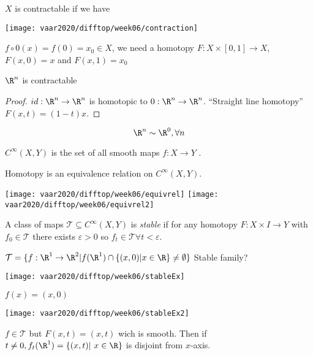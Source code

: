 $X$ is contractable if we have
\begin{center}
    \texttt{[image: vaar2020/difftop/week06/contraction]}
\end{center}
$f \circ 0(x)= f(0)=x_0 \in X$, we need a homotopy
\newline $F: X\times[0,1] \to X$, $F(x,0)=x$ and $F(x,1)=x_0$

\begin{proposition}
  $\R^n$ is contractable
\end{proposition}
\begin{proof}
  $id: \R^n \to \R^n$ is homotopic to $0: \R^n \to \R^n$. ``Straight line homotopy'' $F(x,t)=(1-t)x$.
    \qedhere
\end{proof}
$$\R^n \sim \R^0 , \forall n$$

\begin{notation}
  $C^{\infty}(X,Y)$ is the set of all smooth maps $f: X \to Y$ .
\end{notation}
\begin{remark}
  Homotopy is an equivalence relation on $C^{\infty}(X,Y)$.
\end{remark}

  \begin{center}
    \texttt{[image: vaar2020/difftop/week06/equivrel]}
    \texttt{[image: vaar2020/difftop/week06/equivrel2]}
  \end{center}

\begin{definition}
  A class of maps $\mathcal{T} \subseteq C^{\infty}(X,Y)$ is \emph{stable} if for any homotopy $F: X \times I \to Y$ with $f_0 \in \mathcal{T}$ there exists $\varepsilon >0$ so $f_t \in \mathcal{T} \forall t <\varepsilon$.
\end{definition}
\begin{example}
  $\mathcal{T}=\{f: \R^1 \to \R^2 | f(\R^1) \cap \{(x,0) | x\in \R \} \neq \emptyset \}$ Stable family?
    \begin{center}
      \texttt{[image: vaar2020/difftop/week06/stableEx]}
    \end{center}
\end{example}

\begin{example}
  $f(x)=(x,0)$
  \begin{center}
    \texttt{[image: vaar2020/difftop/week06/stableEx2]}
  \end{center}
  $f \in \mathcal{T}$ but $F(x,t)=(x,t)$ wich is smooth. Then if $t\neq 0, f_t(\R^1)= \{(x,t) | x\in \R \}$ is disjoint from $x$-axis.
\end{example}

